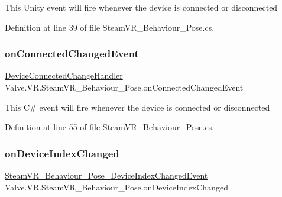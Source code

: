 This Unity event will fire whenever the device is connected or disconnected 



Definition at line 39 of file Steam\+V\+R\+\_\+\+Behaviour\+\_\+\+Pose.\+cs.

\mbox{\label{class_valve_1_1_v_r_1_1_steam_v_r___behaviour___pose_a6892abf4f394100985f6f0caa4ee0471}} 
\subsubsection{\texorpdfstring{onConnectedChangedEvent}{onConnectedChangedEvent}}
{\footnotesize\ttfamily \mbox{\hyperlink{class_valve_1_1_v_r_1_1_steam_v_r___behaviour___pose_abb026a5887e19143d6b95452453dc8de}{Device\+Connected\+Change\+Handler}} Valve.\+V\+R.\+Steam\+V\+R\+\_\+\+Behaviour\+\_\+\+Pose.\+on\+Connected\+Changed\+Event}



This C\# event will fire whenever the device is connected or disconnected 



Definition at line 55 of file Steam\+V\+R\+\_\+\+Behaviour\+\_\+\+Pose.\+cs.

\mbox{\label{class_valve_1_1_v_r_1_1_steam_v_r___behaviour___pose_a99f240404e0a47b614cb20246c395e47}} 
\subsubsection{\texorpdfstring{onDeviceIndexChanged}{onDeviceIndexChanged}}
{\footnotesize\ttfamily \mbox{\hyperlink{class_valve_1_1_v_r_1_1_steam_v_r___behaviour___pose___device_index_changed_event}{Steam\+V\+R\+\_\+\+Behaviour\+\_\+\+Pose\+\_\+\+Device\+Index\+Changed\+Event}} Valve.\+V\+R.\+Steam\+V\+R\+\_\+\+Behaviour\+\_\+\+Pose.\+on\+Device\+Index\+Changed}



